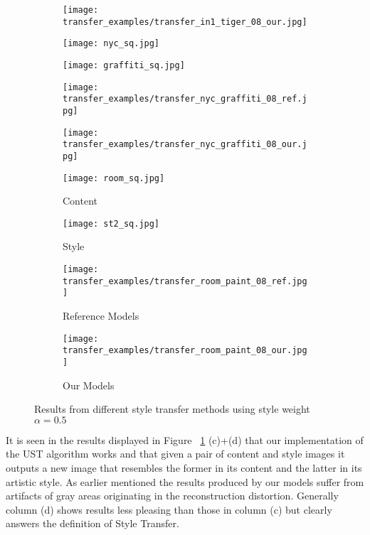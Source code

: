 \begin{figure}[H]
	\begin{subfigure}[b]{0.225\linewidth}
		\texttt{[image: transfer\_examples/transfer\_in1\_tiger\_08\_our.jpg]} %
	\end{subfigure}
	\centering
	\begin{subfigure}[b]{0.225\linewidth}
		\texttt{[image: nyc\_sq.jpg]} %
	\end{subfigure}
	\begin{subfigure}[b]{0.225\linewidth}
		\texttt{[image: graffiti\_sq.jpg]} %
	\end{subfigure}
	\begin{subfigure}[b]{0.225\linewidth}
		\texttt{[image: transfer\_examples/transfer\_nyc\_graffiti\_08\_ref.jpg]} %
	\end{subfigure}
	\begin{subfigure}[b]{0.225\linewidth}
		\texttt{[image: transfer\_examples/transfer\_nyc\_graffiti\_08\_our.jpg]} %
	\end{subfigure}
	\centering
	\begin{subfigure}[b]{0.225\linewidth}
		\texttt{[image: room\_sq.jpg]} %
		\caption{Content}
	\end{subfigure}
	\begin{subfigure}[b]{0.225\linewidth}
		\texttt{[image: st2\_sq.jpg]} %
		\caption{Style}
	\end{subfigure}
	\begin{subfigure}[b]{0.225\linewidth}
		\texttt{[image: transfer\_examples/transfer\_room\_paint\_08\_ref.jpg]} %
		\caption{Reference Models}
	\end{subfigure}
	\begin{subfigure}[b]{0.225\linewidth}
		\texttt{[image: transfer\_examples/transfer\_room\_paint\_08\_our.jpg]} %
		\caption{Our Models}
	\end{subfigure}
	\caption{Results from different style transfer methods using style weight $\alpha=0.5$}
	\label{fig:style_transfer}
\end{figure}

It is seen in the results displayed in Figure ~\ref{fig:style_transfer} (c)+(d) that our implementation of the UST algorithm works and that given a pair of content and style images it outputs a new image that resembles the former in its content and the latter in its artistic style. As earlier mentioned the results produced by our models suffer from artifacts of gray areas originating in the reconstruction distortion. Generally column (d) shows results less pleasing than those in column (c) but clearly answers the definition of Style Transfer. \\

